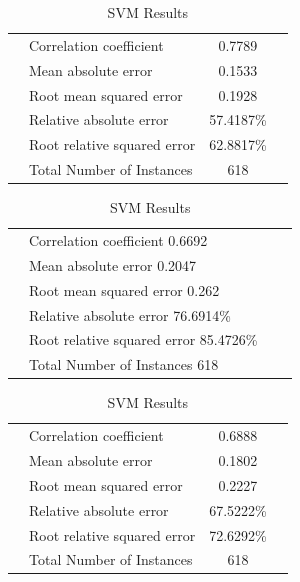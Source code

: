 \begin{table}[ht]
\begin{center}
\begin{tabular}{ ll c r }
\hline
 & Correlation coefficient  &                0.7789 \\
 & Mean absolute error       &               0.1533 \\
 & Root mean squared error   &               0.1928 \\
 & Relative absolute error   &              57.4187\% \\
 & Root relative squared error  &           62.8817\% \\
 & Total Number of Instances     &         618  \\
\hline
\end{tabular}
\label{tab:svm3}
\caption{SVM Results}
\end{center}
\end{table}

\begin{table}[ht]
\begin{center}
\begin{tabular}{ ll c r }
\hline
 & Correlation coefficient                  0.6692 \\
 & Mean absolute error                      0.2047 \\
 & Root mean squared error                  0.262 \\
 & Relative absolute error                 76.6914\% \\
 & Root relative squared error             85.4726\% \\
 & Total Number of Instances              618  \\
\hline
\end{tabular}
\label{tab:svm4}
\caption{SVM Results}
\end{center}
\end{table}


\begin{table}[ht]
\begin{center}
\begin{tabular}{ ll c r }
\hline
 & Correlation coefficient   &              0.6888 \\
 & Mean absolute error        &              0.1802 \\
 & Root mean squared error    &              0.2227 \\
 & Relative absolute error    &             67.5222\% \\
 & Root relative squared error &             72.6292\% \\
 & Total Number of Instances   &           618     \\
\hline
\end{tabular}
\label{tab:svm5}
\caption{SVM Results}
\end{center}
\end{table}

